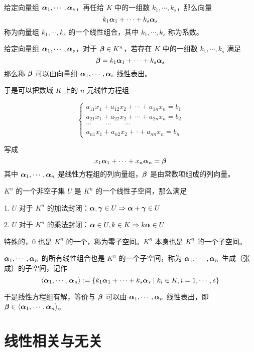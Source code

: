 \begin{definition}[线性组合]
	给定向量组 $\boldsymbol{\alpha}_1,\cdots,\boldsymbol{\alpha}_s$，再任给 $K$ 中的一组数 $k_1,\cdots,k_s$，那么向量
	$$k_1 \boldsymbol{\alpha}_1+\cdots+k_s \boldsymbol{\alpha}_s$$
	称为向量组 $k_1,\cdots,k_s$ 的一个线性组合，其中 $k_1,\cdots,k_s$ 称为系数。
\end{definition}

\begin{definition}[线性表出]
	给定向量组 $\boldsymbol{\alpha}_1,\cdots,\boldsymbol{\alpha}_s$，对于 $\boldsymbol{\beta} \in K^n$，若存在 $K$ 中的一组数 $k_1,\cdots,k_s$ 满足
	$$\boldsymbol{\beta} = k_1\boldsymbol{\alpha}_1+\cdots+k_s\boldsymbol{\alpha}_s$$
	那么称 $\boldsymbol{\beta}$ 可以由向量组 $\boldsymbol{\alpha}_1,\cdots,\boldsymbol{\alpha}_s$ 线性表出。
\end{definition}

于是可以把数域 $K$ 上的 $n$ 元线性方程组

\begin{equation*}
	\left\{
		\begin{matrix}
			a_{11}x_1+a_{12}x_2+\cdots+a_{1n}x_n=b_1\\
			a_{21}x_1+a_{22}x_2+\cdots+a_{2n}x_n=b_2\\
			\cdots\qquad\cdots\qquad\cdots\\
			a_{n1}x_1+a_{n2}x_2+\cdot +a_{nn}x_n=b_n
		\end{matrix}
	\right.
\end{equation*}

写成
$$x_1\boldsymbol{\alpha}_1+\cdots+x_n\boldsymbol{\alpha}_n=\boldsymbol{\beta}$$
其中 $\boldsymbol{\alpha}_1,\cdots,\boldsymbol{\alpha}_n$ 是线性方程组的列向量组，$\boldsymbol{\beta}$ 是由常数项组成的列向量。

\begin{definition}[线性子空间]
	$K^n$ 的一个非空子集 $U$ 是 $K^n$ 的一个线性子空间，那么满足
	
	1. $U$ 对于 $K^n$ 的加法封闭：$\boldsymbol{\alpha},\boldsymbol{\gamma}\in U \Rightarrow \boldsymbol{\alpha}+\boldsymbol{\gamma} \in U$

	2. $U$ 对于 $K^n$ 的乘法封闭：$\boldsymbol{\alpha} \in U,k\in K \Rightarrow k\boldsymbol{\alpha} \in U$
\end{definition}

特殊的，${0}$ 也是 $K^n$ 的一个，称为零子空间。$K^n$ 本身也是 $K^n$ 的一个子空间。

$\boldsymbol{\alpha}_1,\cdots,\boldsymbol{\alpha}_n$ 的所有线性组合也是 $K^n$ 的一个子空间，称为 $\boldsymbol{\alpha}_1,\cdots,\boldsymbol{\alpha}_n$ 生成（张成）的子空间，记作
$$\langle \boldsymbol{\alpha}_1,\cdots,\boldsymbol{\alpha}_n\rangle:=\{k_1\boldsymbol{\alpha}_1+\cdots+k_s\boldsymbol{\alpha}_s \mid k_i\in K,i=1,\cdots,s\}$$

于是线性方程组有解，等价与 $\boldsymbol{\beta}$ 可以由 $\boldsymbol{\alpha}_1,\cdots,\boldsymbol{\alpha}_n$ 线性表出，即 $\boldsymbol{\beta} \in \langle\boldsymbol{\alpha}_1,\cdots,\boldsymbol{\alpha}_n\rangle$。

\section{线性相关与无关}

